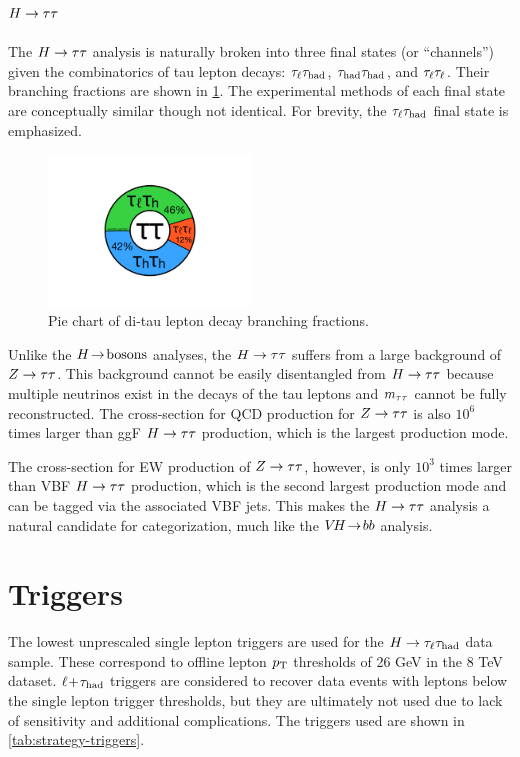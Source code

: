 \subsection{$H\rightarrow\tau\tau$}
\label{sec:strategy-htautau}

The $H\rightarrow\tau\tau$ analysis is naturally broken into three final states (or ``channels'') given the combinatorics of tau lepton decays: $\tau_\ell\tau_\text{had}$, $\tau_\text{had}\tau_\text{had}$, and $\tau_\ell\tau_\ell$. Their branching fractions are shown in \cref{fig:strategy-decaypie}. The experimental methods of each final state are conceptually similar though not identical. For brevity, the $\tau_\ell\tau_\text{had}$ final state is emphasized.

\begin{figure}[tp]
  \centering
  \includegraphics[width=0.48\textwidth]{figures/piecharts/tautaudecay}
  \caption{Pie chart of di-tau lepton decay branching fractions.}
  \label{fig:strategy-decaypie}
\end{figure}

Unlike the $H \!\rightarrow\! \text{bosons}$ analyses, the $H\rightarrow\tau\tau$ suffers from a large background of $Z\rightarrow\tau\tau$. This background cannot be easily disentangled from $H\rightarrow\tau\tau$ because multiple neutrinos exist in the decays of the tau leptons and $m_{\tau\tau}$ cannot be fully reconstructed. The cross-section for QCD production for $Z\rightarrow\tau\tau$ is also $10^6$ times larger than ggF $H\rightarrow\tau\tau$ production, which is the largest production mode.

The cross-section for EW production of $Z\rightarrow\tau\tau$, however, is only $10^3$ times larger than VBF $H\rightarrow\tau\tau$ production, which is the second largest production mode and can be tagged via the associated VBF jets. This makes the $H\rightarrow\tau\tau$ analysis a natural candidate for categorization, much like the $V\!H \!\rightarrow\! bb$ analysis.

\section{Triggers}
\label{sec:strategy-triggers}

The lowest unprescaled single lepton triggers are used for the $H\rightarrow\tau_\ell\tau_\text{had}$ data sample. These correspond to offline lepton $p_{\mathrm{T}}$ thresholds of 26 GeV in the 8 TeV dataset. $\ell\!+\!\tau_\text{had}$ triggers are considered to recover data events with leptons below the single lepton trigger thresholds, but they are ultimately not used due to lack of sensitivity and additional complications. The triggers used are shown in \cref{tab:strategy-triggers}.

